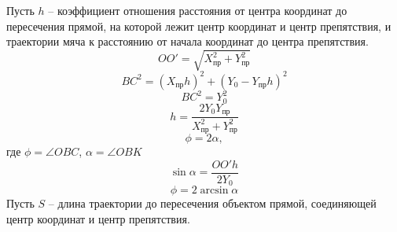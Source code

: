 \documentclass[a5paper, 10pt]{article}
\theoremstyle{definition}
\theoremstyle{plain}
\theoremstyle{remark}
\begin{document}
Пусть $h$ -- коэффициент отношения расстояния от центра координат до пересечения прямой, на которой лежит центр координат и центр препятствия, и траектории мяча к расстоянию от начала координат до центра препятствия.
\begin{equation}
OO' = \sqrt{ X_{\text{пр}}^2 + Y_{\text{пр}}^2}
\end{equation}
\begin{equation}
BC^2 = \left( X_{\text{пр}} h \right)^2 + \left( Y_0 - Y_{\text{пр}} h \right)^2
\end{equation}
\begin{equation}
BC^2 =  Y_0^2
\end{equation}
\begin{equation}
h = \frac{2 Y_0  Y_{\text{пр}}}{X_{\text{пр}}^2 +  Y_{\text{пр}}^2 }
\end{equation}
\begin{equation}
\phi = 2 \alpha, 
\end{equation}
где $\phi = \angle OBC$, $\alpha = \angle OBK$
\begin{equation}
\sin \alpha = \frac{OO' h}{2 Y_0}
\end{equation}
\begin{equation}
\phi = 2 \arcsin \alpha
\end{equation}
Пусть $S$ -- длина траектории до пересечения объектом прямой, соединяющей центр координат и центр препятствия.
\end{document}
